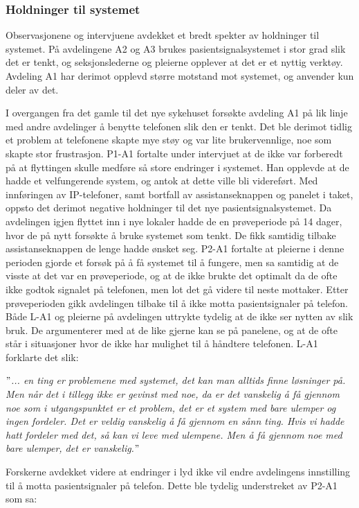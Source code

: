 \subsubsection{Holdninger til systemet}
Observasjonene og intervjuene avdekket et bredt spekter av holdninger til systemet. På avdelingene A2 og A3 brukes pasientsignalsystemet i stor grad slik det er tenkt, og seksjonslederne og pleierne opplever at det er et nyttig verktøy. Avdeling A1 har derimot opplevd større motstand mot systemet, og anvender kun deler av det.

\noindent
I overgangen fra det gamle til det nye sykehuset forsøkte avdeling A1 på lik linje med andre avdelinger å benytte telefonen slik den er tenkt. Det ble derimot tidlig et problem at telefonene skapte mye støy og var lite brukervennlige, noe som skapte stor frustrasjon. P1-A1 fortalte under intervjuet at de ikke var forberedt på at flyttingen skulle medføre så store endringer i systemet. Han opplevde at de hadde et velfungerende system, og antok at dette ville bli videreført. Med innføringen av IP-telefoner, samt bortfall av assistanseknappen og panelet i taket, oppsto det derimot negative holdninger til det nye pasientsignalsystemet. Da avdelingen igjen flyttet inn i nye lokaler hadde de en prøveperiode på 14 dager, hvor de på nytt forsøkte å bruke systemet som tenkt. De fikk samtidig tilbake assistanseknappen de lenge hadde ønsket seg. P2-A1 fortalte at pleierne i denne perioden gjorde et forsøk på å få systemet til å fungere, men sa samtidig at de visste at det var en prøveperiode, og at de ikke brukte det optimalt da de ofte ikke godtok signalet på telefonen, men lot det gå videre til neste mottaker. Etter prøveperioden gikk avdelingen tilbake til å ikke motta pasientsignaler på telefon. Både L-A1 og pleierne på avdelingen uttrykte tydelig at de ikke ser nytten av slik bruk. De argumenterer med at de like gjerne kan se på panelene, og at de ofte står i situasjoner hvor de ikke har mulighet til å håndtere telefonen. L-A1 forklarte det slik: 

\noindent
\textit{$"$... en ting er problemene med systemet, det kan man alltids finne løsninger på. Men når det i tillegg ikke er gevinst med noe, da er det vanskelig å få gjennom noe som i utgangspunktet er et problem, det er et system med bare ulemper og ingen fordeler. Det er veldig vanskelig å få gjennom en sånn ting. Hvis vi hadde hatt fordeler med det, så kan vi leve med ulempene. Men å få gjennom noe med bare ulemper, det er vanskelig.$"$}

\noindent
Forskerne avdekket videre at endringer i lyd ikke vil endre avdelingens innstilling til å motta pasientsignaler på telefon. Dette ble tydelig understreket av P2-A1 som sa:

